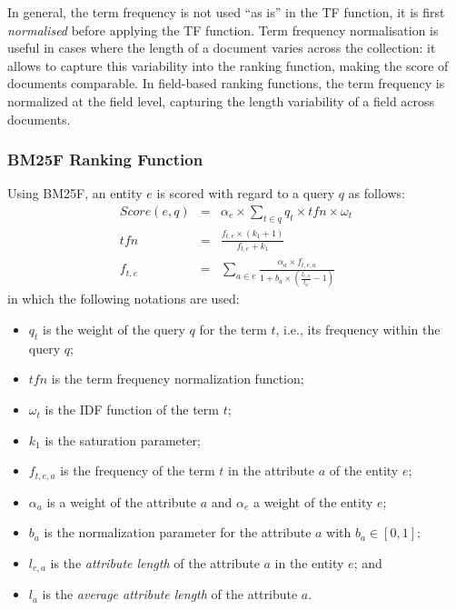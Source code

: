 In general, the term frequency is not used ``as is'' in the TF function, it is first \emph{normalised} before applying the TF function. Term frequency normalisation is useful in cases where the length of a document varies across the collection: it allows to capture this variability into the ranking function, making the score of documents comparable. In field-based ranking functions, the term frequency is normalized at the field level, capturing the length variability of a field across documents.

\subsubsection{BM25F Ranking Function}

Using BM25F, an entity $e$ is scored with regard to a query $q$ as follows:
\begin{eqnarray}
Score(e,q) & = & \alpha_e\times\sum_{t\in q}{q_t\times tfn \times \omega_t}\\
\label{eq:tfidf-score}
tfn & = & \frac{f_{t,e}\times(k_1+1)}{f_{t,e}+k_1} \\
\label{eq:bm25f_2}
f_{t,e} & = &
\sum_{a\in e}{\frac{\alpha_a\times f_{t,e,a}}{1+b_a\times\left(\frac{l_{e,a}}{l_a}-1\right)}}
\label{eq:bm25f_1}
\end{eqnarray}
in which the following notations are used:
\begin{itemize}
	\item $q_t$ is the weight of the query $q$ for the term $t$, i.e., its frequency within the query $q$;
	\item $tfn$ is the term frequency normalization function;
	\item $\omega_t$ is the IDF function of the term $t$;
	\item $k_1$ is the saturation parameter;
	\item $f_{t,e,a}$ is the frequency of the term $t$ in the attribute $a$ of the entity $e$;
	\item $\alpha_a$ is a weight of the attribute $a$ and $\alpha_e$ a weight of the entity $e$;
	\item $b_a$ is the normalization parameter for the attribute $a$ with $b_a \in \left[0,1\right]$;
	\item $l_{e,a}$ is the \emph{attribute length} of the attribute $a$ in the entity $e$; and
	\item $l_a$ is the \emph{average attribute length} of the attribute $a$.
\end{itemize}

